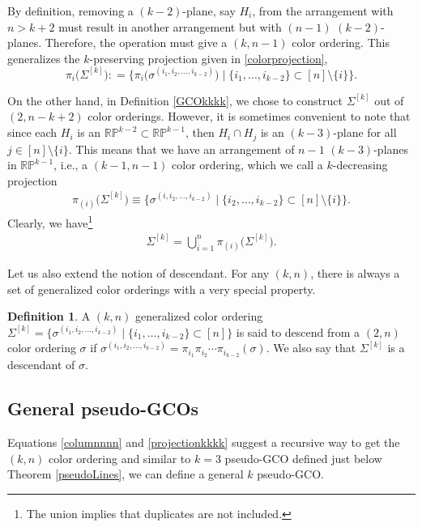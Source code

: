 \documentclass[pdftex]{sigma}
\theoremstyle{definition}
\newtheorem{defn}[thm]{Definition}
\def \be {\begin{equation}}
\def \ee {\end{equation}}
\def \be {\begin{equation}}
\numberwithin{equation}{section}
\begin{document}
 By definition, removing a $(k{-}2)$-plane, say $H_{i}$, from the arrangement with $n>k+2$ must result in another arrangement but with $(n-1)$ $(k{-}2)$-planes. Therefore, the operation must give a $(k,n-1)$ color ordering. This
 generalizes the $k$-preserving projection given in \eqref{colorprojection},
\be
\label{projectionkkkk}
\pi_i\bigl(\Sigma ^{[k]}\bigr): = \bigl\{ \pi_i\bigl(
\sigma^{(i_1,i_2,\dots,i_{k-2})}
\bigr)
\mid \{i_1,\dots, i_{k-2}\} \subset [n] \setminus \{i\}
\bigr\}.
\ee

On the other hand, in Definition \ref{GCOkkkk}, we chose to construct $\Sigma^{[k]}$ out of $(2,n{-}k{+}2)$ color orderings. However, it is sometimes convenient to
note that since each $H_i$ is an $\mathbb{RP}^{k-2}\subset \mathbb{RP}^{k-1}$, then $H_i\cap H_j$ is an $({k-}3)$-plane for all $j\in [n]\setminus \{i\}$. This means that we have an arrangement of $n-1$ $({k-}3)$-planes in $\mathbb{RP}^{k-1}$, i.e., a $(k{-}1,n-1)$ color ordering, which we call a $k$-decreasing projection
\begin{gather}
\label{component}
\pi_{(i)}\big(\Sigma ^{[k]}\big)
\equiv \big\{ \sigma^{(i,i_2,\dots,i_{k-2})}\mid \{i_2,\dots, i_{k-2}\} \subset [n] \setminus \{i\} \big\}.
\end{gather}
Clearly, we have\footnote{The union implies that duplicates are not included.}
\begin{gather}
\label{columnnnn}
\Sigma^{[k]}=\bigcup_{i=1}^n
\pi_{(i)}\big(\Sigma ^{[k]}\big).
\end{gather}

Let us also extend the notion of descendant. For any $(k,n)$, there is always a set of generalized color orderings
with a very special property.
\begin{defn}\label{globalGCO2}
A $(k,n)$ generalized color ordering $\Sigma^{[k]} = \bigl\{ \sigma^{(i_1,i_2,\dots,i_{k-2})}\mid \{i_1,\dots, i_{k-2}\} \subset [n] \bigr\}$ is said to descend from a $(2,n)$ color ordering $\sigma$ if $\sigma^{(i_1,i_2,\dots,i_{k-2})}=\pi_{i_1}\pi_{i_2}\cdots \pi_{i_{k-2}}(\sigma)$. We also say that $\Sigma^{[k]}$ is a descendant of $\sigma$.
\end{defn}

\subsection{General pseudo-GCOs}

Equations \eqref{columnnnn} and \eqref{projectionkkkk} suggest a recursive way to get the $(k,n)$ color ordering and similar to $k=3$ pseudo-GCO defined just below Theorem \ref{pseudoLines}, we can define a general $k$ pseudo-GCO.
\end{document}
